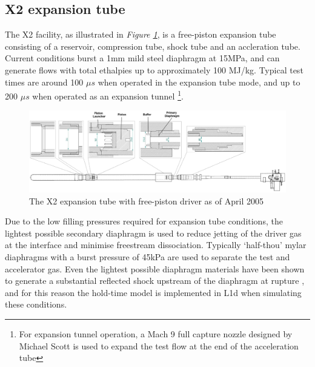 \documentclass[a4paper,10pt]{article}
\begin{document}
\subsection{X2 expansion tube}

The X2 facility, as illustrated in \emph{Figure \ref{fig:x2_tube}}, is a free-piston expansion tube consisting of a reservoir, compression tube, shock tube and an accleration tube.  Current conditions burst a 1mm mild steel diaphragm at 15MPa, and can generate flows with total ethalpies up to approximately 100 MJ/kg.  Typical test times are around 100 $\mu s$ when operated in the expansion tube mode, and up to 200 $\mu s$ when operated as an expansion tunnel \footnote{For expansion tunnel operation, a Mach 9 full capture nozzle designed by Michael Scott \cite{scott} is used to expand the test flow at the end of the acceleration tube}.

\begin{figure}[h]
\centering
\includegraphics[scale=0.2]{figs/x2_plan.eps}
\caption{The X2 expansion tube with free-piston driver as of April 2005 \cite{reno2}}
\label{fig:x2_tube} 
\end{figure}

\par \medskip

Due to the low filling pressures required for expansion tube conditions, the lightest possible secondary diaphragm is used to reduce jetting of the driver gas at the interface and minimise freestream dissociation.  Typically `half-thou' mylar diaphragms with a burst pressure of 45kPa are used to separate the test and accelerator gas.  Even the lightest possible diaphragm materials have been shown to generate a substantial reflected shock upstream of the diaphragm at rupture \cite{bakos}, and for this reason the hold-time model is implemented in L1d when simulating these conditions.

\medskip
\end{document}
